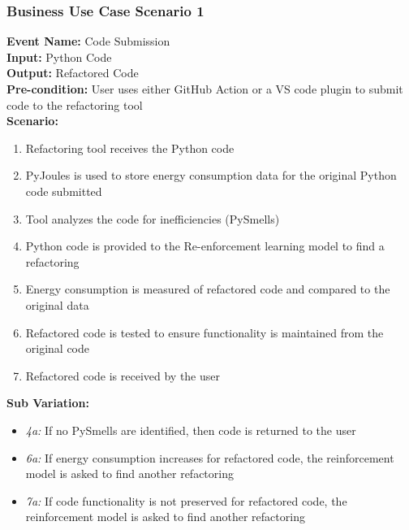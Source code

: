 \documentclass[12pt]{article}
\begin{document}
\subsubsection{Business Use Case Scenario 1}
\textbf{Event Name:} Code Submission \\
\textbf{Input:} Python Code \\
\textbf{Output:} Refactored Code \\
\textbf{Pre-condition:} User uses either GitHub Action or a VS code plugin to submit code to the refactoring tool \\  
\textbf{Scenario:}
    \begin{enumerate}
        \item Refactoring tool receives the Python code
        \item PyJoules is used to store energy consumption data for the original Python code submitted
        \item Tool analyzes the code for inefficiencies (PySmells)
        \item Python code is provided to the Re-enforcement learning model to find a refactoring
        \item Energy consumption is measured of refactored code and compared to the original data
        \item Refactored code is tested to ensure functionality is maintained from the original code
        \item Refactored code is received by the user
    \end{enumerate}
\textbf{Sub Variation: }
    \begin{itemize}
        \item \textit{4a:} If no PySmells are identified, then code is returned to the user
        \item \textit{6a:} If energy consumption increases for refactored code, the reinforcement model is asked to find another refactoring
        \item \textit{7a:} If code functionality is not preserved for refactored code, the reinforcement model is asked to find another refactoring
    \end{itemize}
\end{document}
